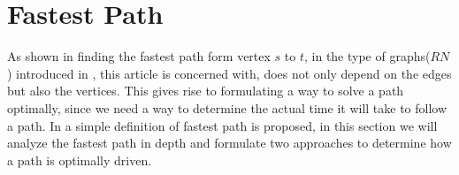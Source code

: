 \section{Fastest Path}
As shown in  finding the fastest path form vertex $s$ to $t$, in the type of graphs($RN$) introduced in , this article is concerned with, does not only depend on the edges but also the vertices. This gives rise to formulating a way to solve a path optimally, since we need a way to determine the actual time it will take to follow a path. In  a simple definition of fastest path is proposed, in this section we will analyze the fastest path in depth and formulate two approaches to determine how a path is optimally driven.  
    

